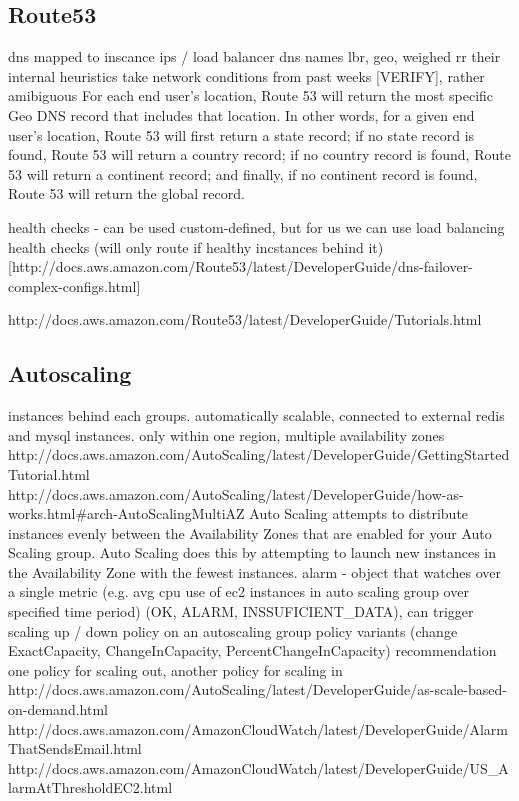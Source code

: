 \documentclass{uvamscse}
\begin{document}
\subsection{Route53}
  dns mapped to inscance ips / load balancer dns names
  lbr, geo, weighed rr
  their internal heuristics take network conditions from past weeks [VERIFY], rather amibiguous
  For each end user’s location, Route 53 will return the most specific Geo DNS record that includes that location. In other words, for a given end user’s location, Route 53 will first return a state record; if no state record is found, Route 53 will return a country record; if no country record is found, Route 53 will return a continent record; and finally, if no continent record is found, Route 53 will return the global record.

  health checks - can be used custom-defined, but for us we can use load balancing health checks (will only route if healthy incstances behind it) [http://docs.aws.amazon.com/Route53/latest/DeveloperGuide/dns-failover-complex-configs.html]

  http://docs.aws.amazon.com/Route53/latest/DeveloperGuide/Tutorials.html
\subsection{Autoscaling}
  instances behind each groups. automatically scalable, connected to external redis and mysql instances.
  only within one region, multiple availability zones
  http://docs.aws.amazon.com/AutoScaling/latest/DeveloperGuide/GettingStartedTutorial.html
  http://docs.aws.amazon.com/AutoScaling/latest/DeveloperGuide/how-as-works.html\#arch-AutoScalingMultiAZ
  Auto Scaling attempts to distribute instances evenly between the Availability Zones that are enabled for your Auto Scaling group. Auto Scaling does this by attempting to launch new instances in the Availability Zone with the fewest instances.
  alarm - object that watches over a single metric (e.g. avg cpu use of ec2 instances in auto scaling group over specified time period) (OK, ALARM, INSSUFICIENT\_DATA), can trigger scaling up / down policy on an autoscaling group
  policy variants (change ExactCapacity, ChangeInCapacity, PercentChangeInCapacity)
  recommendation one policy for scaling out, another policy for scaling in
  http://docs.aws.amazon.com/AutoScaling/latest/DeveloperGuide/as-scale-based-on-demand.html
  http://docs.aws.amazon.com/AmazonCloudWatch/latest/DeveloperGuide/AlarmThatSendsEmail.html
  http://docs.aws.amazon.com/AmazonCloudWatch/latest/DeveloperGuide/US\_AlarmAtThresholdEC2.html
\end{document}

